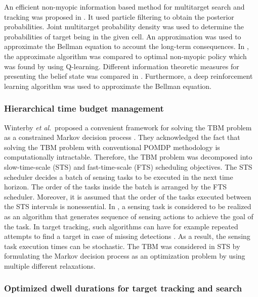 \documentclass[11pt,a4paper]{article}
\newcommand{\etal}{\textit{et al}.~}
\begin{document}
An efficient non-myopic information based method  for multitarget search and tracking was proposed in \cite{Kreucher2004}.
It used particle filtering to obtain the posterior probabilities.
Joint multitarget probability density was used to determine the probabilities of target being in the given cell.
An approximation was used to approximate the Bellman equation to account the long-term consequences. 
In \cite{Kreucher2005}, the approximate algorithm was compared to optimal non-myopic policy which was found by using Q-learning.
Different information theoretic measures for presenting the belief state was compared in \cite{Xu2010}.
Furthermore, a deep reinforcement learning algorithm was used to approximate the Bellman equation.

\subsubsection{Hierarchical time budget management}

Winterby \etal proposed a convenient framework for solving the TBM problem as a constrained Markov decision process \cite{Wintenby2006}.
They acknowledged the fact that solving the TBM problem with conventional POMDP methodology is computationally intractable.
Therefore, the TBM problem was decomposed into slow-time-scale (STS) and fast-time-scale (FTS) scheduling objectives.
The STS scheduler decides a batch of sensing tasks to be executed in the next time horizon.
The order of the tasks inside the batch is arranged by the FTS scheduler.
Moreover, it is assumed that the order of the tasks executed between the STS intervals is nonessential.
In \cite{Wintenby2006}, a sensing task is considered to be realized as an algorithm that generates sequence of sensing actions to achieve the goal of the task.
In target tracking, such algorithms can have for example repeated attempts to find a target in case of missing detections \cite{Wintenby2006}.
As a result, the sensing task execution times can be stochastic.
The TBM was considered in STS by formulating the Markov decision process as an optimization problem by using multiple different relaxations.


\subsubsection{Optimized dwell durations for target tracking and search}
\end{document}
